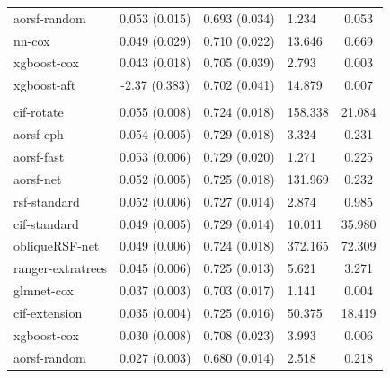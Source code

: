 \documentclass[twoside,11pt]{article}\usepackage[]{graphicx}\usepackage[]{xcolor}
\newenvironment{knitrout}{}{} %
\begin{document}
\begin{knitrout}
\begin{longtable}[t]{lcclc}
\hspace{1em}aorsf-random & 0.053 (0.015) & 0.693 (0.034) & 1.234 & 0.053\\
\hspace{1em}nn-cox & 0.049 (0.029) & 0.710 (0.022) & 13.646 & 0.669\\
\hspace{1em}xgboost-cox & 0.043 (0.018) & 0.705 (0.039) & 2.793 & 0.003\\
\hspace{1em}xgboost-aft & -2.37 (0.383) & 0.702 (0.041) & 14.879 & 0.007\\
\addlinespace[0.3em]
\hline
\multicolumn{5}{l}{\textit{\textbf{Heart Transplant; graft-loss or death, n = 3787, p = 52}}}\\
\hline
\hspace{1em}cif-rotate & 0.055 (0.008) & 0.724 (0.018) & 158.338 & 21.084\\
\hspace{1em}aorsf-cph & 0.054 (0.005) & 0.729 (0.018) & 3.324 & 0.231\\
\hspace{1em}aorsf-fast & 0.053 (0.006) & 0.729 (0.020) & 1.271 & 0.225\\
\hspace{1em}aorsf-net & 0.052 (0.005) & 0.725 (0.018) & 131.969 & 0.232\\
\hspace{1em}rsf-standard & 0.052 (0.006) & 0.727 (0.014) & 2.874 & 0.985\\
\hspace{1em}cif-standard & 0.049 (0.005) & 0.729 (0.014) & 10.011 & 35.980\\
\hspace{1em}obliqueRSF-net & 0.049 (0.006) & 0.724 (0.018) & 372.165 & 72.309\\
\hspace{1em}ranger-extratrees & 0.045 (0.006) & 0.725 (0.013) & 5.621 & 3.271\\
\hspace{1em}glmnet-cox & 0.037 (0.003) & 0.703 (0.017) & 1.141 & 0.004\\
\hspace{1em}cif-extension & 0.035 (0.004) & 0.725 (0.016) & 50.375 & 18.419\\
\hspace{1em}xgboost-cox & 0.030 (0.008) & 0.708 (0.023) & 3.993 & 0.006\\
\hspace{1em}aorsf-random & 0.027 (0.003) & 0.680 (0.014) & 2.518 & 0.218\\

\end{longtable}
\end{knitrout}
\end{document}
